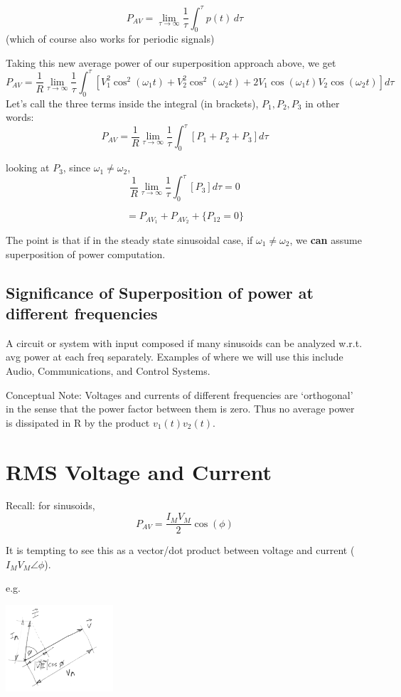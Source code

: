 \[
P_{AV} = \lim_{\tau \rightarrow \infty} \frac{1}{\tau} \int_0^\tau p(t) \, d\tau
\]
(which of course also works for periodic
signals)

Taking this new average power of our superposition approach above, we get
\[
P_{AV} = \frac{1}{R} \lim_{\tau \rightarrow \infty} \frac{1}{\tau} \int_0^\tau \left[ V_1^2 \cos^2(\omega_1 t) + V_2^2 \cos^2(\omega_2 t) + 2V_1 \cos(\omega_1 t) V_2 \cos(\omega_2 t) \right] d\tau
\]
Let's call the three terms inside the integral (in brackets), $P_1, P_2, P_3$ in other words:
\[
P_{AV} =\frac{1}{R} \lim_{\tau \rightarrow \infty} \frac{1}{\tau} \int_0^\tau \left[
P_1 + P_2 + P_3 \right ] d\tau
\]

looking at $P_3$,  since $\omega_1 \neq \omega_2$,
\[
\frac{1}{R} \lim_{\tau \rightarrow \infty} \frac{1}{\tau} \int_0^\tau \left[ P_3 \right ] d\tau = 0
\]

\[
= P_{AV_1} + P_{AV_2} + \{ P_{12} = 0 \}
\]

The point is that if in the steady state sinusoidal case, if $\omega_1 \neq \omega_2$, we {\bf can} assume
superposition of power computation.

\subsection*{Significance of Superposition of power at different frequencies}

A circuit or system with input composed if many sinusoids can be analyzed w.r.t. avg power at each freq separately.  Examples of where we will use this include Audio, Communications,
and Control Systems.

 Conceptual Note: Voltages and currents of different frequencies are `orthogonal' in the sense that the power factor between them is zero.
 Thus no average power is dissipated in R by the product $v_1(t) v_2(t)$.

\noindent



\section{RMS Voltage and Current}
Recall: for sinusoids,
\[
P_{AV} = \frac{I_M V_M}{2} \cos(\phi)
\]

It is tempting to see this as a vector/dot product between voltage and current ($I_M V_M\angle \phi
$).

e.g.

\includegraphics[width=0.3\textwidth]{figsChapt03/UH48274.png}

